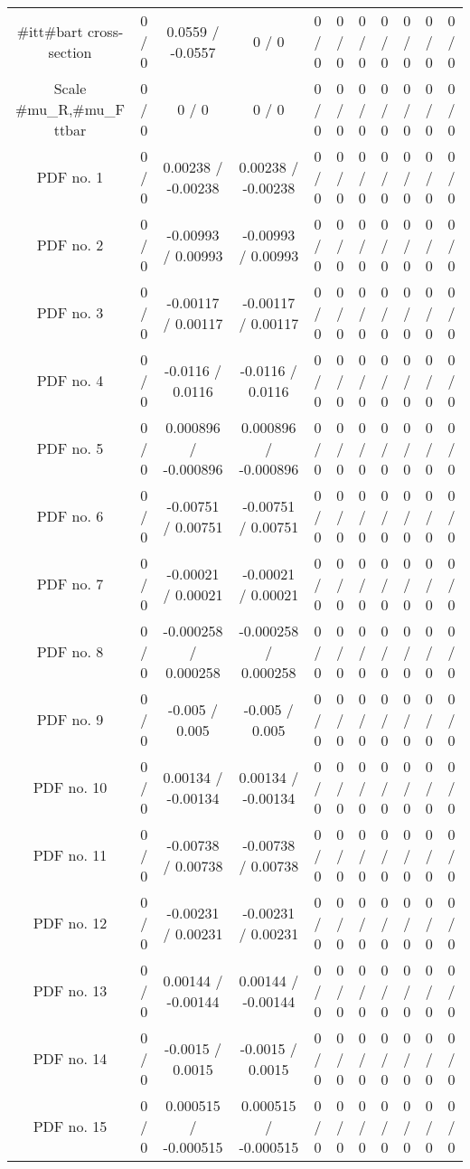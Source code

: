 \begin{table}[htbp]
\begin{center}
\begin{tabular}{|c|c|c|c|c|c|c|c|c|c|c|}
  #it{t#bar{t}} cross-section & 0 / 0 & 0.0559 / -0.0557 & 0 / 0 & 0 / 0 & 0 / 0 & 0 / 0 & 0 / 0 & 0 / 0 & 0 / 0 & 0 / 0 \\ 
  Scale #mu_{R},#mu_{F} ttbar & 0 / 0 & 0 / 0 & 0 / 0 & 0 / 0 & 0 / 0 & 0 / 0 & 0 / 0 & 0 / 0 & 0 / 0 & 0 / 0 \\ 
  PDF no. 1 & 0 / 0 & 0.00238 / -0.00238 & 0.00238 / -0.00238 & 0 / 0 & 0 / 0 & 0 / 0 & 0 / 0 & 0 / 0 & 0 / 0 & 0 / 0 \\ 
  PDF no. 2 & 0 / 0 & -0.00993 / 0.00993 & -0.00993 / 0.00993 & 0 / 0 & 0 / 0 & 0 / 0 & 0 / 0 & 0 / 0 & 0 / 0 & 0 / 0 \\ 
  PDF no. 3 & 0 / 0 & -0.00117 / 0.00117 & -0.00117 / 0.00117 & 0 / 0 & 0 / 0 & 0 / 0 & 0 / 0 & 0 / 0 & 0 / 0 & 0 / 0 \\ 
  PDF no. 4 & 0 / 0 & -0.0116 / 0.0116 & -0.0116 / 0.0116 & 0 / 0 & 0 / 0 & 0 / 0 & 0 / 0 & 0 / 0 & 0 / 0 & 0 / 0 \\ 
  PDF no. 5 & 0 / 0 & 0.000896 / -0.000896 & 0.000896 / -0.000896 & 0 / 0 & 0 / 0 & 0 / 0 & 0 / 0 & 0 / 0 & 0 / 0 & 0 / 0 \\ 
  PDF no. 6 & 0 / 0 & -0.00751 / 0.00751 & -0.00751 / 0.00751 & 0 / 0 & 0 / 0 & 0 / 0 & 0 / 0 & 0 / 0 & 0 / 0 & 0 / 0 \\ 
  PDF no. 7 & 0 / 0 & -0.00021 / 0.00021 & -0.00021 / 0.00021 & 0 / 0 & 0 / 0 & 0 / 0 & 0 / 0 & 0 / 0 & 0 / 0 & 0 / 0 \\ 
  PDF no. 8 & 0 / 0 & -0.000258 / 0.000258 & -0.000258 / 0.000258 & 0 / 0 & 0 / 0 & 0 / 0 & 0 / 0 & 0 / 0 & 0 / 0 & 0 / 0 \\ 
  PDF no. 9 & 0 / 0 & -0.005 / 0.005 & -0.005 / 0.005 & 0 / 0 & 0 / 0 & 0 / 0 & 0 / 0 & 0 / 0 & 0 / 0 & 0 / 0 \\ 
  PDF no. 10 & 0 / 0 & 0.00134 / -0.00134 & 0.00134 / -0.00134 & 0 / 0 & 0 / 0 & 0 / 0 & 0 / 0 & 0 / 0 & 0 / 0 & 0 / 0 \\ 
  PDF no. 11 & 0 / 0 & -0.00738 / 0.00738 & -0.00738 / 0.00738 & 0 / 0 & 0 / 0 & 0 / 0 & 0 / 0 & 0 / 0 & 0 / 0 & 0 / 0 \\ 
  PDF no. 12 & 0 / 0 & -0.00231 / 0.00231 & -0.00231 / 0.00231 & 0 / 0 & 0 / 0 & 0 / 0 & 0 / 0 & 0 / 0 & 0 / 0 & 0 / 0 \\ 
  PDF no. 13 & 0 / 0 & 0.00144 / -0.00144 & 0.00144 / -0.00144 & 0 / 0 & 0 / 0 & 0 / 0 & 0 / 0 & 0 / 0 & 0 / 0 & 0 / 0 \\ 
  PDF no. 14 & 0 / 0 & -0.0015 / 0.0015 & -0.0015 / 0.0015 & 0 / 0 & 0 / 0 & 0 / 0 & 0 / 0 & 0 / 0 & 0 / 0 & 0 / 0 \\ 
  PDF no. 15 & 0 / 0 & 0.000515 / -0.000515 & 0.000515 / -0.000515 & 0 / 0 & 0 / 0 & 0 / 0 & 0 / 0 & 0 / 0 & 0 / 0 & 0 / 0 \\ 

\end{tabular}
\end{center}
\end{table}
